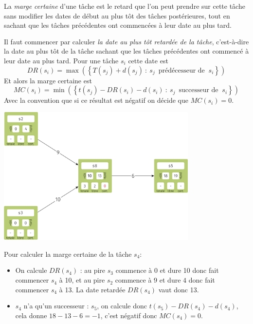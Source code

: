 \begin{definition}
    La \textit{marge certaine} d'une tâche est le retard que l’on peut prendre sur cette tâche sans modifier les dates de début au plus tôt des tâches postérieures, tout en sachant que les tâches précédentes ont commencées à leur date au plus tard.

    Il faut commencer par calculer \textit{la date au plus tôt retardée de la tâche}, c'est-à-dire la date au plus tôt de la tâche sachant que les tâches précédentes ont commencé à leur date au plus tard. Pour une tâche $s_i$ cette date est $$DR(s_i)=\max\left(\left\{T(s_j)+d(s_j)\::\:s_j\,\text{ prédécesseur de }\:s_i\right\}\right)$$
    Et alors la marge certaine est
    $$MC(s_i)=\min\left(\left\{t(s_j)-DR(s_i)-d(s_i)\::\:s_j\,\text{ successeur de }\:s_i\right\}\right)$$
    Avec la convention que si ce résultat est négatif on décide que $MC(s_i)=0$.
\end{definition}
\begin{exemple}[]
    \begin{center}
        \includegraphics[width=10cm]{graphes2/img/mpm_marge_certaine.png}
    \end{center}
    Pour calculer la marge certaine de la tâche $s_4$:
    \begin{itemize}
        \item 	On calcule $DR(s_4)$ : au pire $s_3$ commence à 0 et dure 10 donc fait commencer $s_4$ à 10, et au pire $s_2$ commence à 9 et dure $4$ donc fait commencer $s_4$ à 13. La date retardée $DR(s_4)$ vaut donc 13.
        \item 	$s_4$ n'a qu'un successeur : $s_5$, on calcule donc $t(s_5)-DR(s_4)-d(s_4)$, cela donne $18-13-6=-1$, c'est négatif donc $MC(s_4)=0$.
    \end{itemize}

\end{exemple}

